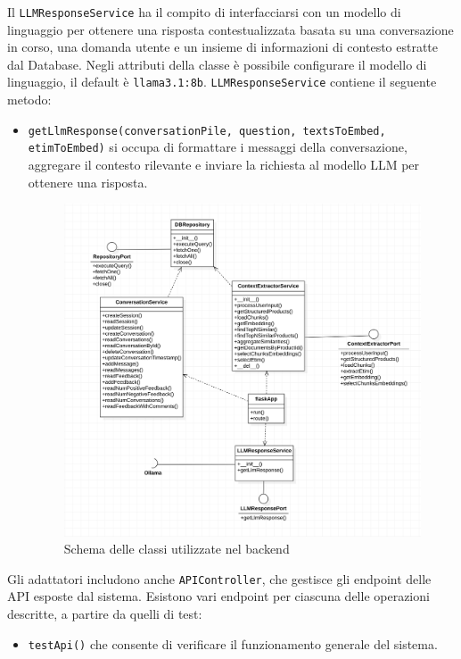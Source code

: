 Il \texttt{LLMResponseService} ha il compito di interfacciarsi con un modello di linguaggio per ottenere una risposta contestualizzata basata su una conversazione in corso, una domanda utente e un insieme di informazioni di contesto estratte dal Database.
Negli attributi della classe \`e possibile configurare il modello di linguaggio, il default \`e \texttt{llama3.1:8b}.
\texttt{LLMResponseService} contiene il seguente metodo:
\begin{itemize}
    \item \texttt{getLlmResponse(conversationPile, question, textsToEmbed, etimToEmbed)} si occupa di formattare i messaggi della conversazione, aggregare il contesto rilevante e inviare la richiesta al modello LLM per ottenere una risposta.
\begin{figure}[H]
    \centering
    \includegraphics[width=\textwidth]{images/BackendUML.png}
    \caption{Schema delle classi utilizzate nel backend}
    \label{fig:architettura}
\end{figure}

\end{itemize}

Gli adattatori includono anche \texttt{APIController}, che gestisce gli endpoint delle API esposte dal sistema. Esistono vari endpoint per ciascuna delle operazioni descritte, a partire da quelli di test:
\begin{itemize}
    \item \texttt{testApi()} che consente di verificare il funzionamento generale del sistema.
\end{itemize}

